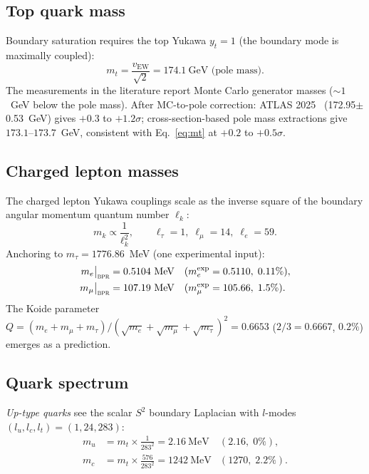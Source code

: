 \documentclass[aps,prd,twocolumn,superscriptaddress,longbibliography,nofootinbib]{revtex4-2}
\newcommand{\Stwo}{S^2}
\newcommand{\vEW}{v_{\mathrm{EW}}}
\newcommand{\bpr}{\textsc{bpr}}
\begin{document}
\subsection{Top quark mass}

Boundary saturation requires the top Yukawa $y_t = 1$ (the boundary mode
is maximally coupled):
\begin{equation}
m_t = \frac{\vEW}{\sqrt{2}} = 174.1~\text{GeV (pole mass)}.
\label{eq:mt}
\end{equation}
The measurements in the literature report Monte Carlo generator masses
($\sim 1$~GeV below the pole mass).  After MC-to-pole correction:
ATLAS 2025~\cite{ATLAS2025mt} (172.95$\pm$0.53~GeV) gives $+0.3$ to $+1.2\sigma$;
cross-section-based pole mass extractions give $173.1$--$173.7$~GeV,
consistent with Eq.~\eqref{eq:mt} at $+0.2$ to $+0.5\sigma$.

\subsection{Charged lepton masses}

The charged lepton Yukawa couplings scale as the inverse square of the
boundary angular momentum quantum number $\ell_k$:
\begin{equation}
m_k \propto \frac{1}{\ell_k^2}, \qquad
\ell_\tau = 1,\; \ell_\mu = 14,\; \ell_e = 59.
\end{equation}
Anchoring to $m_\tau = 1776.86$~MeV (one experimental input):
\begin{align}
m_e\big|_{\bpr} &= 0.5104~\text{MeV} &(m_e^{\text{exp}} &= 0.5110,\; 0.11\%), \\
m_\mu\big|_{\bpr} &= 107.19~\text{MeV} &(m_\mu^{\text{exp}} &= 105.66,\; 1.5\%).
\end{align}
The Koide parameter $Q = (m_e + m_\mu + m_\tau)/(\sqrt{m_e}+\sqrt{m_\mu}+\sqrt{m_\tau})^2
= 0.6653$ ($2/3 = 0.6667$, $0.2\%$) emerges as a prediction.

\subsection{Quark spectrum}

\textit{Up-type quarks} see the scalar $\Stwo$ boundary Laplacian with
$l$-modes $(l_u, l_c, l_t) = (1, 24, 283)$:
\begin{align}
m_u &= m_t \times \frac{1}{283^2} = 2.16~\text{MeV} & (2.16,\; 0\%), \\
m_c &= m_t \times \frac{576}{283^2} = 1242~\text{MeV} & (1270,\; 2.2\%).
\end{align}
\end{document}
